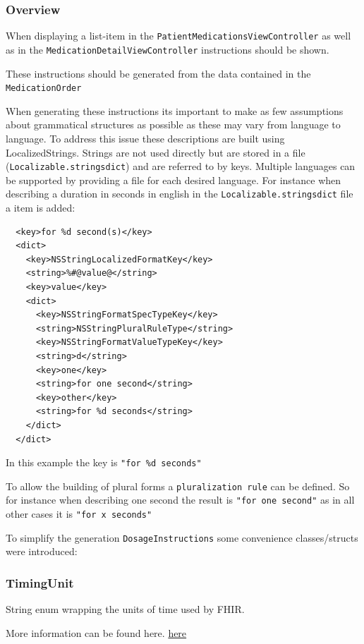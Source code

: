 \documentclass{article}
\begin{document}
\subsubsection{Overview}
When displaying a list-item in the
\texttt{PatientMedicationsViewController} as well as in the
\texttt{MedicationDetailViewController} instructions should be shown.

These instructions should be generated from the data contained in the
\texttt{MedicationOrder}

When generating these instructions its important to make as few
assumptions about grammatical structures as possible as these may vary
from language to language.
To address this issue these descriptions are built using
LocalizedStrings.
Strings are not used directly but are stored in a file
(\texttt{Localizable.stringsdict}) and are referred to by keys.
Multiple languages can be supported by providing a file for each desired
language.
For instance when describing a duration in seconds in english in the \texttt{Localizable.stringsdict} file a item is added:

\begin{verbatim}
  <key>for %d second(s)</key>
  <dict>
    <key>NSStringLocalizedFormatKey</key>
    <string>%#@value@</string>
    <key>value</key>
    <dict>
      <key>NSStringFormatSpecTypeKey</key>
      <string>NSStringPluralRuleType</string>
      <key>NSStringFormatValueTypeKey</key>
      <string>d</string>
      <key>one</key>
      <string>for one second</string>
      <key>other</key>
      <string>for %d seconds</string>
    </dict>
  </dict>
\end{verbatim}
In this example the key is \texttt{"for\ \%d\ seconds"}

To allow the building of plural forms a \texttt{pluralization rule} can be defined.
So for instance when describing one second the result is \texttt{"for\ one\ second"} as in
all other cases it is \texttt{"for\ x\ seconds"}

To simplify the generation \texttt{DosageInstructions} some convenience
classes/structs were introduced:

\subsubsection{TimingUnit}\label{timingunit}
String enum wrapping the units of time used by FHIR.

More information can be found here.
\href{https://www.hl7.org/fhir/valueset-units-of-time.html}{here}
\end{document}
